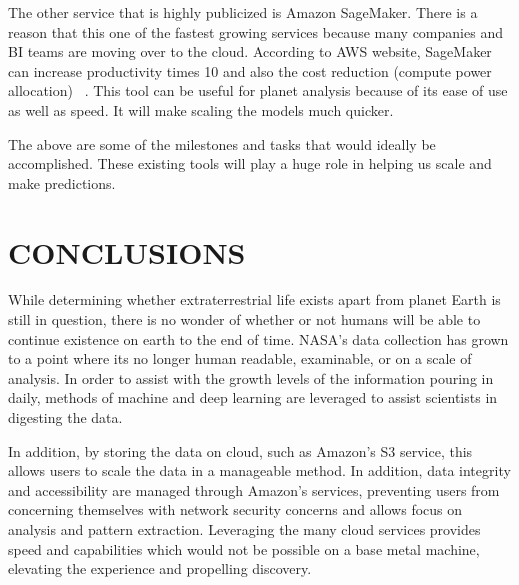 \documentclass[letterpaper, 10 pt, conference]{ieeeconf}  %
\begin{document}
The other service that is highly publicized is Amazon SageMaker. There is a reason that this one of the fastest growing services because many companies and BI teams are moving over to the cloud. According to AWS website, SageMaker can increase productivity times 10 and also the cost reduction (compute power allocation) ~\cite{AmazonSagemaker}. This tool can be useful for planet analysis because of its ease of use as well as speed. It will make scaling the models much quicker. 

The above are some of the milestones and tasks that would ideally be accomplished. These existing tools will play a huge role in helping us scale and make predictions.

\section{CONCLUSIONS}

While determining whether extraterrestrial life exists apart from planet Earth is still in question, there is no wonder of whether or not humans will be able to continue existence on earth to the end of time. NASA's data collection has grown to a point where its no longer human readable, examinable, or on a scale of analysis. In order to assist with the growth levels of the information pouring in daily, methods of machine and deep learning are leveraged to assist scientists in digesting the data. 

In addition, by storing the data on cloud, such as Amazon's S3 service, this allows users to scale the data in a manageable method. In addition, data integrity and accessibility are managed through Amazon's services, preventing users from concerning themselves with network security concerns and allows focus on analysis and pattern extraction. Leveraging the many cloud services provides speed and capabilities which would not be possible on a base metal machine, elevating the experience and propelling discovery. 

\addtolength{\textheight}{-12cm}   %


{}

\end{document}

